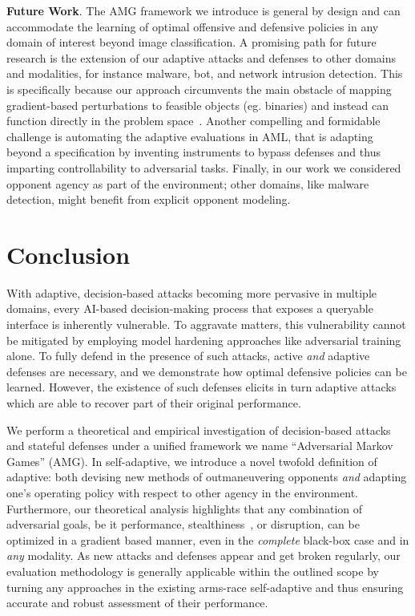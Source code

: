 \textbf{Future Work}.
The AMG framework we introduce is general by design and can accommodate the learning of optimal offensive and defensive policies in any domain of interest beyond image classification.
A promising path for future research is the extension of our adaptive attacks and defenses to other domains and modalities, for instance malware, bot, and network intrusion detection.
This is specifically because our approach circumvents the main obstacle of mapping gradient-based perturbations to feasible objects (eg. binaries) and instead can function directly in the problem space~\cite{pierazzi2020intriguing}.
Another compelling and formidable challenge is automating the adaptive evaluations in \gls{AML}, that is adapting beyond a specification by inventing instruments to bypass defenses and thus imparting controllability to adversarial tasks.
Finally, in our work we considered opponent agency as part of the environment; other domains, like malware detection, might benefit from explicit opponent modeling.

\section{Conclusion}

With adaptive, decision-based attacks becoming more pervasive in multiple domains, every AI-based decision-making process that exposes a queryable interface is inherently vulnerable.
To aggravate matters, this vulnerability cannot be mitigated by employing model hardening approaches like adversarial training alone.
To fully defend in the presence of such attacks, active \emph{and} adaptive defenses are necessary, and we demonstrate how optimal defensive policies can be learned.
However, the existence of such defenses elicits in turn adaptive attacks which are able to recover part of their original performance.

We perform a theoretical and empirical investigation of decision-based attacks and stateful defenses under a unified framework we name ``Adversarial Markov Games'' (AMG).
In self-adaptive, we introduce a novel twofold definition of adaptive: both devising new methods of outmaneuvering opponents \textit{and} adapting one's operating policy with respect to other agency in the environment.
Furthermore, our theoretical analysis highlights that any combination of adversarial goals, be it performance, stealthiness~\cite{debenedetti2024evading}, or disruption, can be optimized in a gradient based manner, even in the \emph{complete} black-box case and in \emph{any} modality.
As new attacks and defenses appear and get broken regularly, our evaluation methodology is generally applicable within the outlined scope by turning any approaches in the existing arms-race self-adaptive and thus ensuring accurate and robust assessment of their performance.

